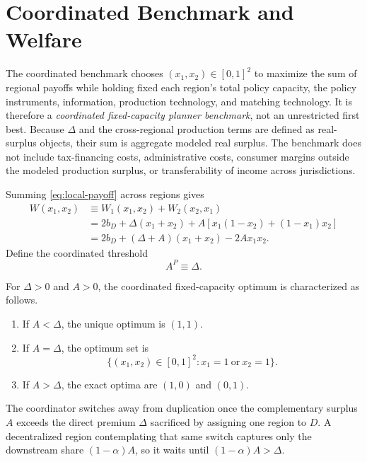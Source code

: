 \section{Coordinated Benchmark and Welfare}
\label{sec:welfare}

The coordinated benchmark chooses $(x_1,x_2)\in[0,1]^2$ to maximize the sum of regional payoffs while holding fixed each region's total policy capacity, the policy instruments, information, production technology, and matching technology. It is therefore a \emph{coordinated fixed-capacity planner benchmark}, not an unrestricted first best. Because $\Delta$ and the cross-regional production terms are defined as real-surplus objects, their sum is aggregate modeled real surplus. The benchmark does not include tax-financing costs, administrative costs, consumer margins outside the modeled production surplus, or transferability of income across jurisdictions.

Summing \eqref{eq:local-payoff} across regions gives
\begin{align}
W(x_1,x_2)
&\equiv W_1(x_1,x_2)+W_2(x_2,x_1)\\
&=2b_D+\Delta(x_1+x_2)
+A\left[x_1(1-x_2)+(1-x_1)x_2\right]\\
&=2b_D+(\Delta+A)(x_1+x_2)-2Ax_1x_2.
\label{eq:aggregate-welfare}
\end{align}
Define the coordinated threshold
\begin{equation}
A^P\equiv \Delta.
\label{eq:AP}
\end{equation}

\begin{proposition}
\label{prop:planner}
For $\Delta>0$ and $A>0$, the coordinated fixed-capacity optimum is characterized as follows.
\begin{enumerate}
\item If $A<\Delta$, the unique optimum is $(1,1)$.
\item If $A=\Delta$, the optimum set is
\[
\{(x_1,x_2)\in[0,1]^2:x_1=1\ \text{or}\ x_2=1\}.
\]
\item If $A>\Delta$, the exact optima are $(1,0)$ and $(0,1)$.
\end{enumerate}
\end{proposition}

The coordinator switches away from duplication once the complementary surplus $A$ exceeds the direct premium $\Delta$ sacrificed by assigning one region to $D$. A decentralized region contemplating that same switch captures only the downstream share $(1-\alpha)A$, so it waits until $(1-\alpha)A>\Delta$.

